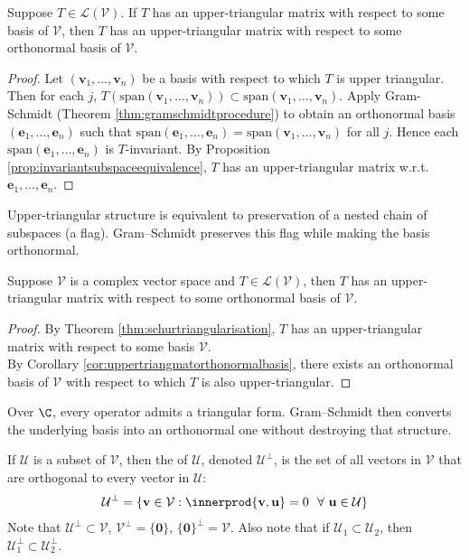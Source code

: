 \begin{corollary} \label{cor:uppertriangmatorthonormalbasis} Suppose $T \in \mathcal{L}(\mathcal{V})$. If $T$ has an upper-triangular matrix with respect to some basis of $\mathcal{V}$, then $T$ has an upper-triangular matrix with respect to some orthonormal basis of $\mathcal{V}$.
\begin{proof} Let $(\mathbf{v}_1, \ldots, \mathbf{v}_n)$ be a basis with respect to which $T$ is upper triangular.\\
Then for each $j$, $T(\text{span}(\mathbf{v}_1, \ldots, \mathbf{v}_n)) \subset \text{span}(\mathbf{v}_1, \ldots, \mathbf{v}_n)$. Apply Gram-Schmidt (Theorem \ref{thm:gramschmidtprocedure}) to obtain an orthonormal basis $(\mathbf{e}_1, \ldots, \mathbf{e}_n)$ such that $\text{span}(\mathbf{e}_1, \ldots, \mathbf{e}_n) = \text{span}(\mathbf{v}_1, \ldots, \mathbf{v}_n)$ for all $j$. Hence each $\text{span}(\mathbf{e}_1, \ldots, \mathbf{e}_n)$ is $T$-invariant. By Proposition \ref{prop:invariantsubspaceequivalence}, $T$ has an upper-triangular matrix w.r.t. $\mathbf{e}_1, \ldots, \mathbf{e}_n$.
\end{proof}
\end{corollary}

Upper-triangular structure is equivalent to preservation of a nested chain of subspaces (a flag). Gram–Schmidt preserves this flag while making the basis orthonormal.

\begin{corollary} \label{cor:complexvecspaceuppertrigmatorthonbasis} Suppose $\mathcal{V}$ is a complex vector space and $T \in \mathcal{L}(\mathcal{V})$, then $T$ has an upper-triangular matrix with respect to some orthonormal basis of $\mathcal{V}$.
\begin{proof} By Theorem \ref{thm:schurtriangularisation}, $T$ has an upper-triangular matrix with respect to some basis $\mathcal{V}$.\\
By Corollary \ref{cor:uppertriangmatorthonormalbasis}, there exists an orthonormal basis of $\mathcal{V}$ with respect to which $T$ is also upper-triangular.
\end{proof}
\end{corollary}

Over $\C$, every operator admits a triangular form. Gram–Schmidt then converts the underlying basis into an orthonormal one without destroying that structure.

\begin{definition} If $\mathcal{U}$ is a subset of $\mathcal{V}$, then the  of $\mathcal{U}$, denoted $\mathcal{U}^{\perp}$, is the set of all vectors in $\mathcal{V}$ that are orthogonal to every vector in $\mathcal{U}$:
\begin{align}
\mathcal{U}^{\perp} = \{ \mathbf{v} \in \mathcal{V}: \innerprod{\mathbf{v}, \mathbf{u}} = 0 \ \ \forall \ \mathbf{u} \in \mathcal{U} \} \nonumber
\end{align}
Note that $\mathcal{U}^{\perp} \subset \mathcal{V}$, $\mathcal{V}^{\perp} = \{ \mathbf{0} \}$, $\{ \mathbf{0} \}^{\perp} = \mathcal{V}$. Also note that if $\mathcal{U}_1 \subset \mathcal{U}_2$, then $\mathcal{U}^{\perp}_1 \subset \mathcal{U}^{\perp}_2$.
\end{definition}

